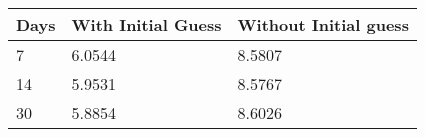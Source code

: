 \begin{tabular}{lll}
Days & With Initial Guess & Without Initial guess \\ 
\hline 
7 & 6.0544 & 8.5807 \\ 
14 & 5.9531 & 8.5767 \\ 
30 & 5.8854 & 8.6026 \\ 
\hline 
\end{tabular}